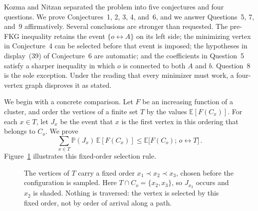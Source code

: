 \documentclass[11pt]{article}
\theoremstyle{definition}
\theoremstyle{remark}
\newcommand{\PP}{\mathbb P}
\newcommand{\EE}{\mathbb E}
\newcommand{\con}{\leftrightarrow}
\begin{document}
Kozma and Nitzan separated the problem into five conjectures and four questions. We prove
Conjectures~1, 2, 3, 4, and~6, and we answer Questions~5, 7, and~9 affirmatively. Several
conclusions are stronger than requested. The pre-FKG inequality retains the event
$\{o\con A\}$ on its left side; the minimizing vertex in Conjecture~4 can be selected
before that event is imposed; the hypotheses in display~(39) of Conjecture~6 are
automatic; and the coefficients in Question~5 satisfy a sharper inequality in which $o$
is connected to both $A$ and $b$. Question~8 is the sole exception. Under the reading
that every minimizer must work, a four-vertex graph disproves it as stated.

We begin with a concrete comparison. Let $F$ be an increasing function of a cluster, and
order the vertices of a finite set $T$ by the values $\EE[F(C_x)]$. For each $x\in T$, let
$J_x$ be the event that $x$ is the first vertex in this ordering that belongs to $C_o$.
We prove
\[
  \sum_{x\in T}\PP(J_x)\,\EE[F(C_x)]
  \leq \EE\bigl[F(C_o);\,o\con T\bigr] \,.
\]
Figure~\ref{fig:first-vertex} illustrates this fixed-order selection rule.
\begin{figure}[htbp]
\centering
{}
\caption{The vertices of $T$ carry a fixed order $x_1\prec x_2\prec x_3$, chosen before the
configuration is sampled. Here $T\cap C_o=\{x_2,x_3\}$, so $J_{x_2}$ occurs and $x_2$ is
shaded. Nothing is traversed: the vertex is selected by this fixed order, not by order of
arrival along a path.}
\label{fig:first-vertex}
\end{figure}
\end{document}

